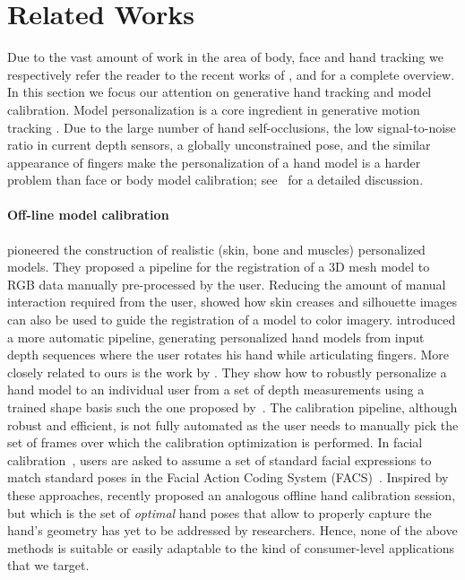 \section{Related Works}
Due to the vast amount of work in the area of body, face and hand tracking we respectively refer the reader to the recent works of \cite{bogo2015detailed}, \cite{cao2016real} and \cite{taylor2016joint} for a complete overview. In this section we focus our attention on generative hand tracking and model calibration. Model personalization is a core ingredient in generative motion tracking \cite{pons2011model}.  Due to the large number of hand self-occlusions, the low signal-to-noise ratio in current depth sensors, a globally unconstrained pose, and the similar appearance of fingers make the personalization of a hand model is a harder problem than face or body model calibration; see~\cite{supancic2015depth} for a detailed discussion.

\paragraph{Off-line model calibration}
\cite{albrecht2003construction} pioneered the construction of realistic (skin, bone and muscles) personalized models. They proposed a pipeline for the registration of a 3D mesh model to RGB data manually pre-processed by the user. Reducing the amount of manual interaction required from the user, \cite{rhee2006human} showed how skin creases and silhouette images can also be used to guide the registration of a model to color imagery. \cite{taylor2014user} introduced a more automatic pipeline, generating personalized hand models from input depth sequences where the user rotates his hand while articulating fingers. More closely related to ours is the work by \cite{tan2016fits}. They show how to robustly personalize a hand model to an individual user from a set of depth measurements using a trained shape basis such the one proposed by~\cite{khamis2015learning}. The calibration pipeline, although robust and efficient, is not fully automated as the user needs to manually pick the set of frames over which the calibration optimization is performed. 
In facial calibration~\cite{weise2011realtime}, users are asked to assume a set of standard facial expressions to match standard poses in the Facial Action Coding System (FACS)~\cite{facs}.
Inspired by these approaches, \cite{taylor2016joint} recently proposed an analogous offline hand calibration session, but which is the set of \emph{optimal} hand poses that allow to properly capture the hand's geometry has yet to be addressed by researchers. Hence, none of the above methods is suitable or easily adaptable to the kind of consumer-level applications that we target.

